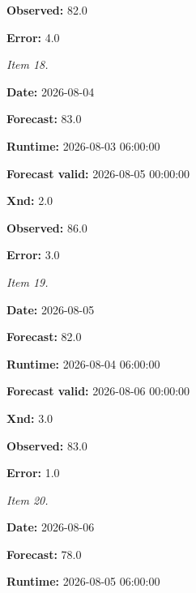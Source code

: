 \documentclass[11pt]{article}
\begin{document}
\par\noindent\textbf{Observed:} 82.0

\par\noindent\textbf{Error:} 4.0

\par\noindent\textit{Item 18.}\par \par\noindent\textbf{Date:} 2026-08-04

\par\noindent\textbf{Forecast:} 83.0

\par\noindent\textbf{Runtime:} 2026-08-03 06:00:00

\par\noindent\textbf{Forecast valid:} 2026-08-05 00:00:00

\par\noindent\textbf{Xnd:} 2.0

\par\noindent\textbf{Observed:} 86.0

\par\noindent\textbf{Error:} 3.0

\par\noindent\textit{Item 19.}\par \par\noindent\textbf{Date:} 2026-08-05

\par\noindent\textbf{Forecast:} 82.0

\par\noindent\textbf{Runtime:} 2026-08-04 06:00:00

\par\noindent\textbf{Forecast valid:} 2026-08-06 00:00:00

\par\noindent\textbf{Xnd:} 3.0

\par\noindent\textbf{Observed:} 83.0

\par\noindent\textbf{Error:} 1.0

\par\noindent\textit{Item 20.}\par \par\noindent\textbf{Date:} 2026-08-06

\par\noindent\textbf{Forecast:} 78.0

\par\noindent\textbf{Runtime:} 2026-08-05 06:00:00
\end{document}
